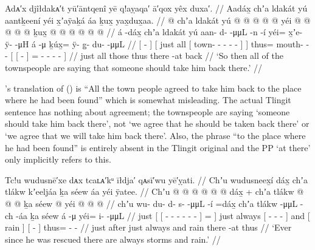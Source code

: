 \ex\label{ex:106-36-take-him-back}%
%
\begingl
	\glpreamble	Adᴀ′x djîłdakᴀ′t yū′āntqenî yē q!aỵaqa′ ā′qox yêx duxa′. //
	\glpreamble	Aadáx̱ chʼa ldakát yú aantḵeení yéi x̱ʼaÿaḵá áa ḵux̱ yax̱dux̱aa. //
	\gla	{}  @ {} {}
		{} chʼa ldakát yú {}  @ {} @ {} @ {} @ {} @ {} {} {}
		yéi @  @ {} @ {} @ {}
		{} {}  @ {} {} ḵux̱ @  @ {} @ {} @ {} @ {} @ {} {} //
	\glb	{} á -dáx̱ {}
		{} chʼa ldakát yú {} aan- d-  -μμL -n -í {} {}
		yéi= x̱ʼe- ÿ-  -μH
		{} {} á -μ {} ḵúx̱=
			ÿ- {} g̱- du-  -μμL {} //
	\glc	{}[  - {}]
		{}[ just all  {}[ town- -  - - - {}] {}]
		thus= mouth- -  -
		{}[ {}[  - {}] =
			- \· - -  - {}] //
	\gld	{}  {} {}
		{} just all those {}  {} {} {} {} {} {} {}
		thus  {} {} {}
		{} {} there -at {} back\•  {} {} {} {} {} {} //
	\glft	‘So then all of the townspeople are saying that someone should take him back there.’
		//
\endgl
\xe

\citeauthor{swanton:1909}’s translation of (\lastx) is “All the town people agreed to take him back to the place where he had been found” which is somewhat misleading.
The actual Tlingit sentence has nothing about agreement; the townspeople are saying ‘someone should take him back there’, not ‘we agree that he should be taken back there’ or ‘we agree that we will take him back there’.
Also, the phrase “to the place where he had been found” is entirely absent in the Tlingit original and the PP  ‘at there’ only implicitly refers to this.

\ex\label{ex:106-37-storm-and-rain}%
%
\begingl
	\glpreamble	Tc!u wudusnē′xe dᴀx tcaʟᴀ′kᵘ īłdja′ qᴀsī′wu yē′ỵati. //
	\glpreamble	Chʼu wudusneex̱í dáx̱ chʼa tlákw kʼeeljáa ḵa séew áa yéi ÿatee. //
	\gla	Chʼu {} {}  @ {} @ {} @ {} @ {} @ {} @ {} {} \•dáx̱ {} +
		chʼa tlákw {}  @ {} @ {} @ {} {} ḵa {} séew {}
		{}  @ {} {} yéi @  @ {} @ {} //
	\glb	chʼu {} {} wu- du- d- s-  -μμL -í {} =dáx̱ {}
		chʼa tlákw {}  -μμL -ch -áa {} ḵa {} séew {}
		{} á -μ {} yéi= i-  -μμL //
	\glc	just {}[ {}[ - - - -  - - {}]
			= {}]
		just always 
		{}[  - - - {}] and {}[ rain {}]
		{}[  - {}] thus= -  - //
	\gld	just {} {}  {} {} {} {} {} {} {} \•after {}
		just always {}  {} {} {} {} and {} rain {}
		{} there -at {} thus  {} {} //
	\glft	‘Ever since he was rescued there are always storms and rain.’
		//
\endgl
\xe

